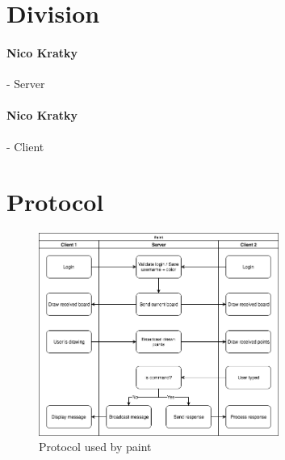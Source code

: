 \documentclass[12pt]{article}
\begin{document}
\section{Division}
\paragraph{Nico Kratky}- Server
\paragraph{Nico Kratky}- Client

\pagebreak

\section{Protocol}
\begin{figure}[h]
    \centering
    \includegraphics[width=0.7\textwidth]{protocol}
    \caption{Protocol used by paint}
    \label{fig:mesh1}
\end{figure}
\end{document}
